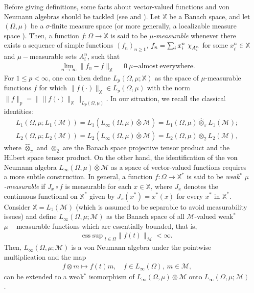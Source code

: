 \documentclass[psamsfonts]{amsart}
\newcommand*{\bigchi}{\mbox{\large$\chi$}}
\newcommand{\Lp}{L_p}
\newcommand{\Lone}{L_1}
\newcommand{\Linfty}{L_\infty}
\newcommand{\Ltwo}{L_2}
\begin{document}
  
Before giving definitions, some facts about vector-valued functions and von Neumann algebras should be tackled (see \cite[Chapter 2]{DU77} and \cite[Section 1.22]{S71}).  Let $\mathbb{X}$ be a Banach space, and let $(\Omega,\mu)$ be a $\sigma$-finite measure space (or more generally, a localizable measure space \cite{S73}). Then, a function $f : \Omega \longrightarrow \mathbb{X}$ is said to be \emph{$\mu$-measurable} whenever there exists a sequence of simple functions $(f_n)_{n \geq 1}$, $f_n = \sum_{i} x_i^n \ \bigchi_{A_i^n}$ for some $x_i^n \in \mathbb{X}$ and $\mu-$measurable sets $A_i^n$, such that
    \begin{align*}
        \lim_{n \rightarrow \infty} \|f_n - f \|_{\mathbb X} = 0 \ \mu\mathrm{-almost \ everywhere}.
    \end{align*}
    For $1\leq p<\infty$, one can then define
    $\Lp(\Omega,\mu;\mathbb{X})$ as the space of $\mu$-measurable
    functions $f$ for which $\|f(\cdot)\|_{\mathbb{X}}\in \Lp(\Omega,\mu)$
    with the norm
    $\|f\|_p=\| \|f(\cdot)\|_{\mathbb{X}}\|_{\Lp(\Omega,\mu)}$.
    In our situation, we recall the classical identities:
    \begin{align*}
      \Lone(\Omega,\mu;\Lone(\mathcal M))=\Lone(L_\infty(\Omega,\mu)\overline \otimes \mathcal M)=  \Lone(\Omega,\mu)\widehat \otimes_\pi \Lone(\mathcal M);\\
      \Ltwo(\Omega,\mu;\Ltwo(\mathcal M))=\Ltwo(L_\infty(\Omega,\mu)\overline \otimes \mathcal M)=\Ltwo(\Omega,\mu) \otimes_2 \Ltwo(\mathcal M),
    \end{align*}
    where $\widehat \otimes_\pi$ and $\otimes_2$ are the Banach space
    projective tensor product and the Hilbert space tensor product. On
    the other hand, the identification of the von Neumann algebra
    $\Linfty(\Omega,\mu) \overline{\otimes} \mathcal{M}$ as a space of
    vector-valued functions requires a more subtle construction. In
    general, a function $f : \Omega \longrightarrow \mathbb{X}^*$ is
    said to be \emph{weak$^*$ $\mu$-measurable} if $J_x \circ f$ is
    measurable for each $x \in \mathbb{X}$, where $J_x$ denotes the
    continuous functional on $\mathbb{X}^*$ given by
    $J_x(x^*) = x^*(x)$ for every $x^*$ in $\mathbb{X}^*$. Consider
    $\mathbb{X} = \Lone(\mathcal{M})$  (which is assumed to be separable to avoid measurability issues) and define
    $\Linfty(\Omega,\mu;\mathcal{M})$ as the Banach space of all
    $\mathcal{M}$-valued weak$^*$ $\mu-$measurable functions which are
    essentially bounded, that is,
    \begin{align*}
        {\mathrm{ess}\sup}_{t \in \Omega} \|f(t)\|_{\mathcal{M}} < \infty.
    \end{align*}
    Then, $\Linfty(\Omega,\mu;\mathcal{M})$ is a von Neumann algebra under the pointwise multiplication and the map
    \begin{align*}
        f \otimes m \mapsto f(t)m, \quad f \in \Linfty(\Omega), \ m \in \mathcal{M},
    \end{align*}
    can be extended to a weak$^*$ isomorphism of $\Linfty(\Omega,\mu) \overline{\otimes} \mathcal{M}$ onto $\Linfty(\Omega, \mu;\mathcal{M})$.
\end{document}
